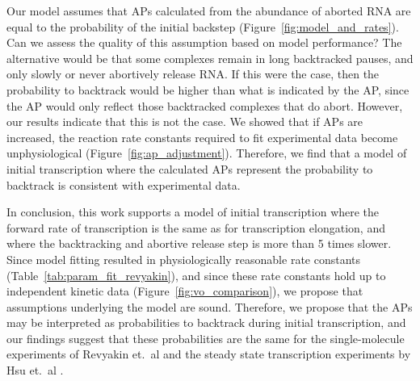 Our model assumes that APs calculated from the abundance of aborted RNA are
equal to the probability of the initial backstep
(Figure~\ref{fig:model_and_rates}). Can we assess the quality of this
assumption based on model performance? The alternative would be that some
complexes remain in long backtracked pauses, and only slowly or never
abortively release RNA. If this were the case, then the probability to
backtrack would be higher than what is indicated by the AP, since the AP would
only reflect those backtracked complexes that do abort. However, our results
indicate that this is not the case. We showed that if APs are increased, the
reaction rate constants required to fit experimental data become
unphysiological (Figure~\ref{fig:ap_adjustment}). Therefore, we find that a
model of initial transcription where the calculated APs represent the
probability to backtrack is consistent with experimental data.

In conclusion, this work supports a model of initial transcription where the
forward rate of transcription is the same as for transcription elongation, and
where the backtracking and abortive release step is more than 5 times slower.
Since model fitting resulted in physiologically reasonable rate constants
(Table~\ref{tab:param_fit_revyakin}), and since these rate constants hold up
to independent kinetic data (Figure~\ref{fig:vo_comparison}), we propose that
assumptions underlying the model are sound. Therefore, we propose that the APs
may be interpreted as probabilities to backtrack during initial transcription,
and our findings suggest that these probabilities are the same for the
single-molecule experiments of Revyakin et.\ al \cite{revyakin_abortive_2006}
and the steady state transcription experiments by Hsu et.\ al
\cite{hsu_initial_2006}.

